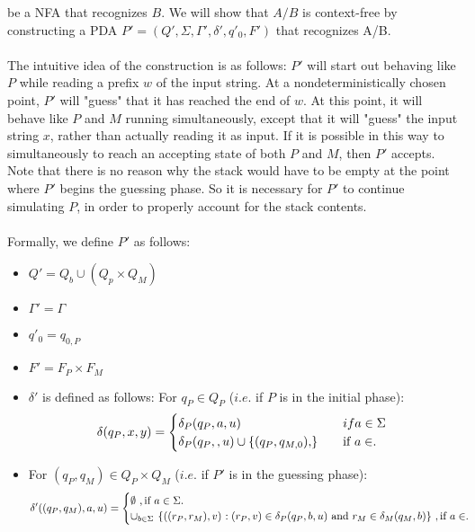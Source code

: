 \documentclass[12pt]{letter}
\newcommand\tab[1][2cm]{\hspace*{#1}}
\begin{document}
\begin{enumerate}
be a NFA that recognizes $B$. We will show that $A/B$ is context-free by constructing a PDA $P' = (Q', \Sigma, \Gamma', \delta', q'_0, F')$ that recognizes A/B.\\
\leavevmode \\
\tab The intuitive idea of the construction is as follows: $P'$ will start out behaving like $P$ while reading a prefix $w$ of the input string. At a nondeterministically chosen point, $P'$ will "guess" that it has reached the end of $w$. At this point, it will behave like $P$ and $M$ running simultaneously, except that it will "guess" the input string $x$, rather than actually reading it as input. If it is possible in this way to simultaneously to reach an accepting state of both $P$ and $M$, then $P'$ accepts. Note that there is no reason why the stack would have to be empty at the point where $P'$ begins the guessing phase. So it is necessary for $P'$ to continue simulating $P$, in order to properly account for the stack contents.\\
\leavevmode \\
\tab Formally, we define $P'$ as follows: \\
	\begin{itemize}
	\item $Q' = Q_b \cup (Q_p \times Q_M)$
	\item $\Gamma' = \Gamma$
	\item $q'_0 = q_{0,P}$
	\item $F' = F_P \times F_M$
	\item $\delta'$ is defined as follows: For $q_P \in Q_P$ ($i.e$. if $P$ is in the initial phase): \\
	\[  \delta (q_P,x,y) = 
		\begin{cases}
			\text{$\delta_P(q_P,a, u$)}  &\quad\text{$if a \in \Sigma$ } \\
	
			\text{$\delta_P(q_P,\empty, u) \cup \{(q_P, q_{M,0}), \empty $\}} 	&\quad\text{if $a \in \empty$.}\\
		\end{cases}
	\]

	\item For $(q_P, q_M) \in Q_P \times Q_M$ ($i.e.$ if $P'$ is in the guessing phase): \\
	\[  \delta'((q_P,q_M),a,u) = 
		\begin{cases}
			\text{$\emptyset$ } , \text{if $a \in \Sigma$.}\\
	
			\text{$\cup_{b \in \Sigma_{\empty}}$ \{$((r_P,r_M), v) $  $: (r_P, v) \in \delta_P(q_P,b,u)$ and $r_M \in \delta_M(q_M,b)$\} } , \text{if $a \in \empty$.}\\
		\end{cases}
	\]


\end{itemize}
\end{enumerate}
\end{document}

